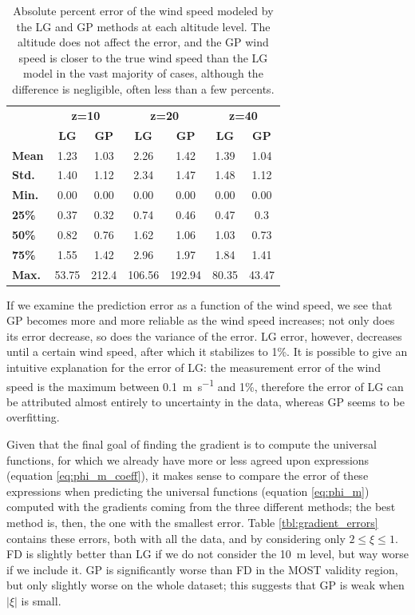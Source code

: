 \documentclass[a4paper,11pt]{kth-mag}
\begin{document}
\begin{table}[]
\centering
\caption{Absolute percent error of the wind speed modeled by the LG and GP methods at each altitude level. The altitude does not affect the error, and the GP wind speed is closer to the true wind speed than the LG model in the vast majority of cases, although the difference is negligible, often less than a few percents.}
\label{tbl:model_wind_errors}
\begin{tabular*}{\textwidth}{l |@{\extracolsep{\fill}} cc|cc|cc}
\toprule
& \multicolumn{2}{c|}{ \textbf{z=10} } & \multicolumn{2}{c|}{ \textbf{z=20 }} & \multicolumn{2}{c}{ \textbf{z=40} } \\
& \textbf{LG} & \textbf{GP} & \textbf{LG} & \textbf{GP} & \textbf{LG} & \textbf{GP} \\
\midrule 
\textbf{Mean} & 1.23 & 1.03 & 2.26 & 1.42 & 1.39 & 1.04 \\
\textbf{Std.} & 1.40 & 1.12 & 2.34 & 1.47 & 1.48 & 1.12 \\
\textbf{Min.} & 0.00 & 0.00 & 0.00 & 0.00 & 0.00 & 0.00 \\
\textbf{25\%} & 0.37 & 0.32 & 0.74 & 0.46 & 0.47 & 0.3  \\
\textbf{50\%} & 0.82 & 0.76 & 1.62 & 1.06 & 1.03 & 0.73 \\
\textbf{75\%} & 1.55 & 1.42 & 2.96 & 1.97 & 1.84 & 1.41 \\
\textbf{Max.} & 53.75 & 212.4 & 106.56 & 192.94 & 80.35 & 43.47 \\
\bottomrule
\end{tabular*} 
\end{table}


If we examine the prediction error as a function of the wind speed, we see that GP becomes more and more reliable as the wind speed increases; not only does its error decrease, so does the variance of the error. LG error, however, decreases until a certain wind speed, after which it stabilizes to 1\%. It is possible to give an intuitive explanation for the error of LG: the measurement error of the wind speed is the maximum between \SI{0.1}{\meter\per\second} and 1\%, therefore the error of LG can be attributed almost entirely to uncertainty in the data, whereas GP seems to be overfitting.

Given that the final goal of finding the gradient is to compute the universal functions, for which we already have more or less agreed upon expressions (equation \ref{eq:phi_m_coeff}), it makes sense to compare the error of these expressions when predicting the universal functions (equation \ref{eq:phi_m}) computed with the gradients coming from the three different methods; the best method is, then, the one with the smallest error. Table \ref{tbl:gradient_errors} contains these errors, both with all the data, and by considering only $2\leq\xi\leq 1$. FD is slightly better than LG if we do not consider the \SI{10}{\meter} level, but way worse if we include it. GP is significantly worse than FD in the MOST validity region, but only slightly worse on the whole dataset; this suggests that GP is weak when $\vert\xi\vert$ is small. 
\end{document}
